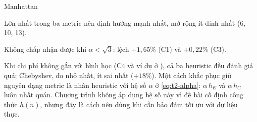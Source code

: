 {Manhattan}{
  \begin{dsdung}
    \item Lớn nhất trong ba metric nên định hướng mạnh nhất, mở rộng ít đỉnh nhất (6, 10, 13).
  \end{dsdung}
  \begin{dssai}
    \item Không chấp nhận được khi $\alpha < \sqrt{3}$: lệch $+1{,}65\%$ (C1) và $+0{,}22\%$ (C3).
  \end{dssai}}

Khi chi phí không gắn với hình học (C4 và ví dụ ở ), cả ba heuristic đều đánh
giá quá; Chebyshev, do nhỏ nhất, ít sai nhất ($+18\%$). Một cách khắc phục giữ nguyên dạng metric là
nhân heuristic với hệ số $\alpha$ ở \eqref{eq:t2-alpha}: $\alpha\, h_E$ và $\alpha\, h_C$ luôn nhất
quán. Chương trình không áp dụng hệ số này vì đề bài cố định công thức $h(n)$, nhưng đây là cách
nên dùng khi cần bảo đảm tối ưu với dữ liệu thực.
